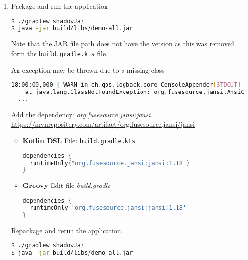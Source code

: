 \begin{enumerate}
	      \begin{lstlisting}[language=bash]
$ ./gradlew clean build
	      \end{lstlisting}

	\item Package and run the application

	      \begin{lstlisting}[language=bash]
$ ./gradlew shadowJar
$ java -jar build/libs/demo-all.jar
	      \end{lstlisting}

	      Note that the JAR file path does not have the version as this was removed form the \texttt{build.gradle.kts} file.

	      An exception may be thrown due to a missing class

	      \begin{lstlisting}[language=bash]
18:00:00,000 |-WARN in ch.qos.logback.core.ConsoleAppender[STDOUT] - Failed to create AnsiPrintStream. Falling back on the default stream. java.lang.ClassNotFoundException: org.fusesource.jansi.AnsiConsole
	at java.lang.ClassNotFoundException: org.fusesource.jansi.AnsiConsole
  ...
	      \end{lstlisting}

	      Add the dependency: \textit{org.fusesource.jansi:jansi}
	      \newline
	      {\footnotesize \url{https://mvnrepository.com/artifact/org.fusesource.jansi/jansi}}

	      \begin{itemize}

	      	\item[] \textbf{Kotlin DSL}
	      	      \newline
	      	      File: \texttt{build.gradle.kts}

	      	      \begin{lstlisting}[language=Kotlin]
dependencies {
  runtimeOnly("org.fusesource.jansi:jansi:1.18")
}
	      	      \end{lstlisting}

	      	\item[] \textbf{Groovy}
	      	      \newline
	      	      Edit file \textit{build.gradle}

	      	      \begin{lstlisting}[language=Groovy]
dependencies {
  runtimeOnly 'org.fusesource.jansi:jansi:1.18'
}
	      	      \end{lstlisting}

	      \end{itemize}

	      Repackage and rerun the application.

	      \begin{lstlisting}[language=bash]
$ ./gradlew shadowJar
$ java -jar build/libs/demo-all.jar
	      \end{lstlisting}

\end{enumerate}

